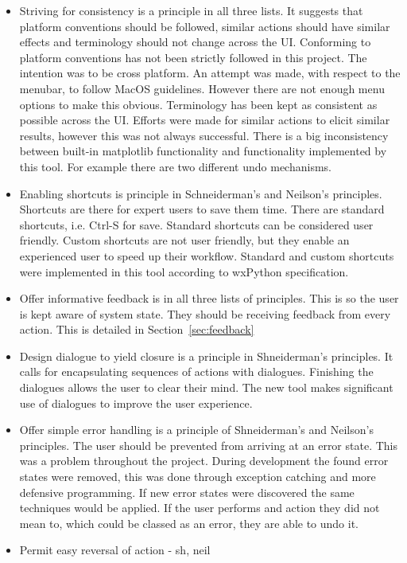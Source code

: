 \begin{itemize}
\item Striving for consistency is a principle in all three lists.  It suggests that platform conventions should be followed, similar actions should have similar effects and terminology should not change across the \ac{UI}.  Conforming to platform conventions has not been strictly followed in this project.  The intention was to be cross platform.  An attempt was made, with respect to the menubar, to follow MacOS guidelines.  However there are not enough menu options to make this obvious.  Terminology has been kept as consistent as possible across the \ac{UI}.  Efforts were made for similar actions to elicit similar results, however this was not always successful.  There is a big inconsistency between built-in matplotlib functionality and functionality implemented by this tool.  For example there are two different undo mechanisms.
\item Enabling shortcuts is principle in Schneiderman's and Neilson's principles.  Shortcuts are there for expert users to save them time.  There are standard shortcuts, i.e. Ctrl-S for save.  Standard shortcuts can be considered user friendly.  Custom shortcuts are not user friendly, but they enable an experienced user to speed up their workflow.  Standard and custom shortcuts were implemented in this tool according to wxPython specification.
\item Offer informative feedback is in all three lists of principles.  This is so the user is kept aware of system state.  They should be receiving feedback from every action.  This is detailed in Section~\ref{sec:feedback}
\item Design dialogue to yield closure is a principle in Shneiderman's principles.  It calls for encapsulating sequences of actions with dialogues.  Finishing the dialogues allows the user to clear their mind.  The new tool makes significant use of dialogues to improve the user experience.
\item Offer simple error handling is a principle of Shneiderman's and Neilson's principles.  The user should be prevented from arriving at an error state.  This was a problem throughout the project.  During development the found error states were removed, this was done through exception catching and more defensive programming.  If new error states were discovered the same techniques would be applied.  If the user performs and action they did not mean to, which could be classed as an error, they are able to undo it.
\item Permit easy reversal of action - sh, neil

\end{itemize}
